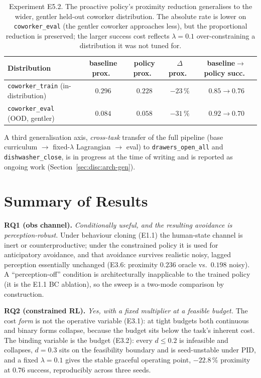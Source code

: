 \documentclass[11pt,a4paper]{report}
\begin{document}
\begin{table}[h]
\centering
\caption{Experiment E5.2. The proactive policy's proximity reduction
generalises to the wider, gentler held-out coworker distribution. The
absolute rate is lower on \texttt{coworker\_eval} (the gentler
coworker approaches less), but the proportional reduction is
preserved; the larger success cost reflects $\lambda = 0.1$
over-constraining a distribution it was not tuned for.}
\label{tab:e5.2-ood}
\small
\begin{tabular}{lcccc}
\toprule
Distribution & baseline prox.\ & policy prox.\ & $\Delta$ prox.\ & baseline$\to$policy succ.\ \\
\midrule
\texttt{coworker\_train} (in-distribution) & $0.296$ & $0.228$ & $-23\,\%$ & $0.85 \to 0.76$ \\
\texttt{coworker\_eval} (OOD, gentler)     & $0.084$ & $0.058$ & $-31\,\%$ & $0.92 \to 0.70$ \\
\bottomrule
\end{tabular}
\end{table}

A third generalisation axis, \emph{cross-task} transfer of the full
pipeline (base curriculum $\rightarrow$ fixed-$\lambda$ Lagrangian
$\rightarrow$ eval) to \texttt{drawers\_open\_all} and
\texttt{dishwasher\_close}, is in progress at the time of writing and
is reported as ongoing work (Section~\ref{sec:disc:arch-gen}).

\section{Summary of Results}
\label{sec:results:summary}

\textbf{RQ1 (obs channel).} \emph{Conditionally useful, and the
resulting avoidance is perception-robust.} Under behaviour cloning
(E1.1) the human-state channel is inert or counterproductive; under
the constrained policy it is used for anticipatory avoidance, and that
avoidance survives realistic noisy, lagged perception essentially
unchanged (E3.6: proximity $0.236$ oracle vs.\ $0.198$ noisy). A
``perception-off'' condition is architecturally inapplicable to the
trained policy (it is the E1.1 BC ablation), so the sweep is a
two-mode comparison by construction.

\textbf{RQ2 (constrained RL).} \emph{Yes, with a fixed multiplier at a
feasible budget.} The cost \emph{form} is not the operative variable
(E3.1): at tight budgets both continuous and binary forms collapse,
because the budget sits below the task's inherent cost. The binding
variable is the budget (E3.2): every $d \le 0.2$ is infeasible and
collapses, $d = 0.3$ sits on the feasibility boundary and is
seed-unstable under PID, and a fixed $\lambda = 0.1$ gives the stable
graceful operating point, $-22.8\,\%$ proximity at $0.76$ success,
reproducibly across three seeds.
\end{document}
